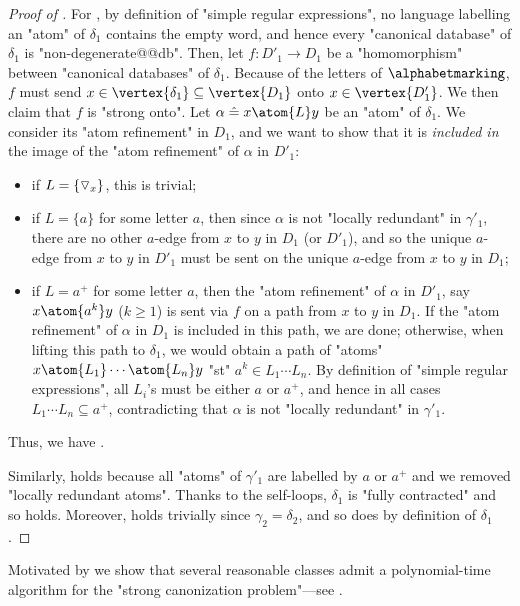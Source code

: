 \begin{proof}[Proof of ]
	For \axiomStrongCanonCore{}, by definition of "simple regular expressions",
	no language labelling an "atom" of $\delta_1$ contains the empty word, and hence
	every "canonical database" of $\delta_1$ is "non-degenerate@@db".
	Then, let $f\colon D'_1 \to D_1$ be a "homomorphism" between "canonical databases"
	of $\delta_1$. Because of the letters of $\alphabetmarking$,
	$f$ must send $x \in \vertex{\delta_1} \subseteq \vertex{D_1}$
	onto $x \in \vertex{D'_1}$. We then claim that $f$ is "strong onto".
	Let $\alpha \defeq x \atom{L} y$ be an "atom" of $\delta_1$.
	We consider its "atom refinement" in $D_1$, and we want to show that it is
	\emph{included in} the image of the "atom refinement" of $\alpha$ in $D'_1$:
	\begin{itemize}
		\item if $L = \{\triangledown_x\}$, this is trivial;
		\item if $L = \{a\}$ for some letter $a$, then since
			$\alpha$ is not "locally redundant" in $\gamma'_1$,
			there are no other $a$-edge from $x$ to $y$ in $D_1$ (or $D'_1$),
			and so the unique $a$-edge from $x$ to $y$ in $D'_1$
			must be sent on the unique $a$-edge from $x$ to $y$ in $D_1$;
		\item if $L = a^+$ for some letter $a$, then the "atom refinement" of $\alpha$ in
			$D'_1$, say $x \atom{a^k} y$ ($k \geq 1$) is sent via $f$ on a path
			from $x$ to $y$ in $D_1$. If the "atom refinement" of $\alpha$ in $D_1$
			is included in this path, we are done; otherwise, when lifting
			this path to $\delta_1$, we would obtain a path of "atoms"
			$x \atom{L_1} \cdots \atom{L_n} y$ "st" $a^k \in L_1\cdots L_n$.
			By definition of "simple regular expressions", all $L_i$'s must
			be either $a$ or $a^+$, and hence in all cases $L_1 \cdots L_n \subseteq a^+$,
			contradicting that $\alpha$ is not "locally redundant" in $\gamma'_1$. 
	\end{itemize}
	Thus, we have \axiomStrongCanonCore{}.

	Similarly, \axiomCanonNonRed{} holds because all "atoms" of $\gamma'_1$ are labelled
	by $a$ or $a^+$ and we removed "locally redundant atoms".
	Thanks to the self-loops, $\delta_1$ is "fully contracted" and so \axiomCanonContracted{} holds.
	Moreover, \axiomCanonContainment{} holds trivially since $\gamma_2 = \delta_2$,
	and so does \axiomCanonMarking{} by definition of $\delta_1$.
\end{proof}

Motivated by 
we show that several reasonable classes admit
a polynomial-time algorithm for the "strong canonization problem"---see
.

